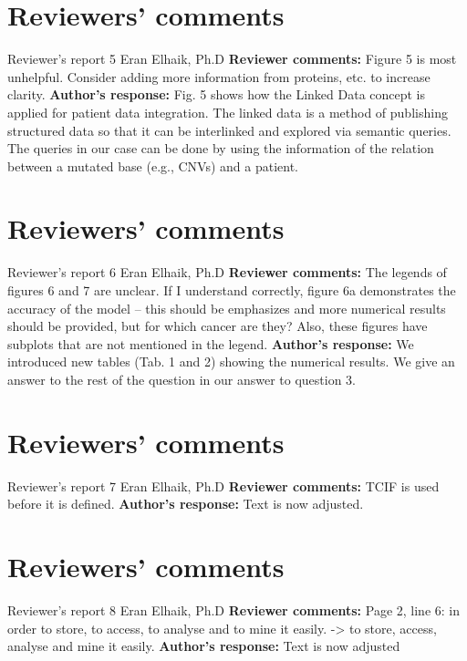 \documentclass{bmcart}
\begin{document}
\begin{backmatter}
\section*{Reviewers' comments}
\newline Reviewer's report 5
\newline Eran Elhaik, Ph.D
\newline \textbf{Reviewer comments:}
 Figure 5 is most unhelpful. Consider adding more information from proteins, etc. to increase clarity.
\newline \textbf{Author's response:}
Fig. 5 shows how the Linked Data concept is applied for patient data integration. The linked data is a method of publishing structured data so that it can be interlinked and explored via semantic queries. The queries in our case can be done by using the information of the relation between a mutated base (e.g., CNVs) and a patient. 

\section*{Reviewers' comments}
\newline Reviewer's report 6
\newline Eran Elhaik, Ph.D
\newline \textbf{Reviewer comments:}
The legends of figures 6 and 7 are unclear. If I understand correctly, figure 6a demonstrates the accuracy of the model – this should be emphasizes and more numerical results should be provided, but for which cancer are they? Also, these figures have subplots that are not mentioned in the legend.
\newline \textbf{Author's response:}
We introduced new tables (Tab. 1 and 2) showing the numerical results. We give an answer to the rest of the question in our answer to question 3.

\section*{Reviewers' comments}
\newline Reviewer's report 7
\newline Eran Elhaik, Ph.D
\newline \textbf{Reviewer comments:}
TCIF is used before it is defined.
\newline \textbf{Author's response:}
Text is now adjusted.


\section*{Reviewers' comments}
\newline Reviewer's report 8
\newline Eran Elhaik, Ph.D
\newline \textbf{Reviewer comments:}
Page 2, line 6: in order to store, to access, to analyse and to mine it easily. -> to store, access, analyse and mine it easily.
\newline \textbf{Author's response:}
Text is now adjusted


\end{backmatter}
\end{document}
